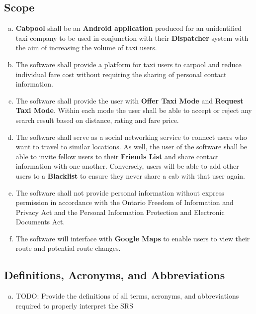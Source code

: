 \documentclass[english]{article}
\begin{document}
\subsection{Scope}
\label{sub:scope}
\begin{enumerate}[a)]
	\item \textbf{Cabpool} shall be an \textbf{Android application} produced for an unidentified taxi company to be used in conjunction with their \textbf{Dispatcher} system with the aim of increasing the volume of taxi users.  
	\item The software shall provide a platform for taxi users to carpool and reduce individual fare cost without requiring the sharing of personal contact information.
	\item The software shall provide the user with \textbf{Offer Taxi Mode} and \textbf{Request Taxi Mode}. Within each mode the user shall be able to accept or reject any search result based on distance, rating and fare price.
	\item The software shall serve as a social networking service to connect users who want to travel to similar locations. As well, the user of the software shall be able to invite fellow users to their \textbf{Friends List} and share contact information with one another. Conversely, users will be able to add other users to a \textbf{Blacklist} to ensure they never share a cab with that user again. 
	\item The software shall not provide personal information without express permission in accordance with the Ontario Freedom of Information and Privacy Act and the Personal Information Protection and Electronic Documents Act. 
	\item The software will interface with \textbf{Google Maps} to enable users to view their route and potential route changes.
	\end{enumerate}

\subsection{Definitions, Acronyms, and Abbreviations}
\label{sub:definitions_acronyms_and_abbreviations}
\begin{enumerate}[a)]
	\item TODO: Provide the definitions of all terms, acronyms, and abbreviations required to properly interpret the SRS
\end{enumerate}
\end{document}

